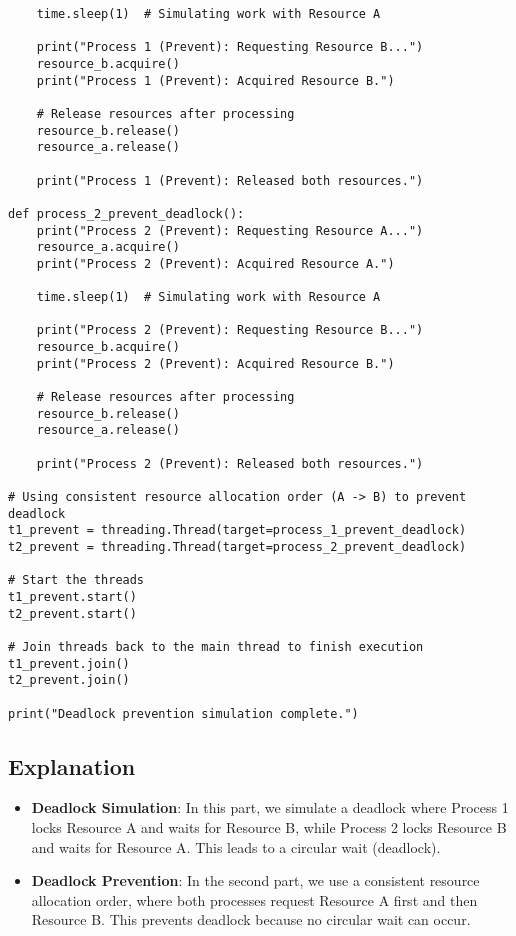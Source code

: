 \documentclass[12pt]{article}
\begin{document}
\begin{lstlisting}
    time.sleep(1)  # Simulating work with Resource A
    
    print("Process 1 (Prevent): Requesting Resource B...")
    resource_b.acquire()
    print("Process 1 (Prevent): Acquired Resource B.")
    
    # Release resources after processing
    resource_b.release()
    resource_a.release()
    
    print("Process 1 (Prevent): Released both resources.")

def process_2_prevent_deadlock():
    print("Process 2 (Prevent): Requesting Resource A...")
    resource_a.acquire()
    print("Process 2 (Prevent): Acquired Resource A.")
    
    time.sleep(1)  # Simulating work with Resource A
    
    print("Process 2 (Prevent): Requesting Resource B...")
    resource_b.acquire()
    print("Process 2 (Prevent): Acquired Resource B.")
    
    # Release resources after processing
    resource_b.release()
    resource_a.release()
    
    print("Process 2 (Prevent): Released both resources.")

# Using consistent resource allocation order (A -> B) to prevent deadlock
t1_prevent = threading.Thread(target=process_1_prevent_deadlock)
t2_prevent = threading.Thread(target=process_2_prevent_deadlock)

# Start the threads
t1_prevent.start()
t2_prevent.start()

# Join threads back to the main thread to finish execution
t1_prevent.join()
t2_prevent.join()

print("Deadlock prevention simulation complete.")
\end{lstlisting}

\subsection*{Explanation}
\begin{itemize}
    \item \textbf{Deadlock Simulation}: In this part, we simulate a deadlock where Process 1 locks Resource A and waits for Resource B, while Process 2 locks Resource B and waits for Resource A. This leads to a circular wait (deadlock).
    \item \textbf{Deadlock Prevention}: In the second part, we use a consistent resource allocation order, where both processes request Resource A first and then Resource B. This prevents deadlock because no circular wait can occur.
\end{itemize}
\end{document}
